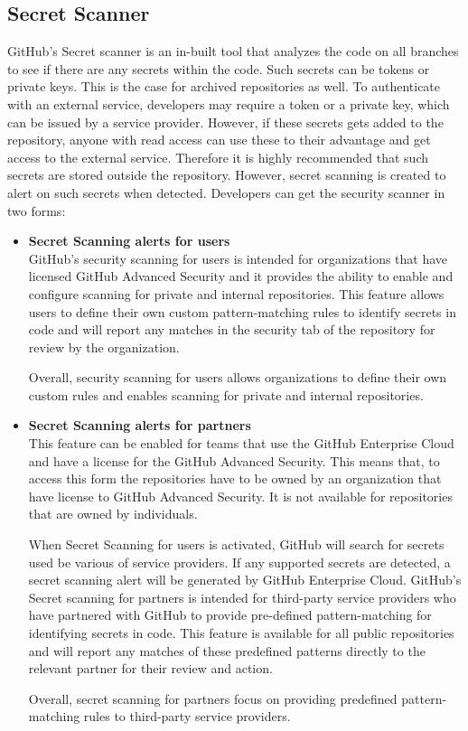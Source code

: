 \subsection{Secret Scanner}
GitHub's Secret scanner is an in-built tool that analyzes the code on all branches to see if there are any secrets within the code. Such secrets can be tokens or private keys. This is the case for archived repositories as well. To authenticate with an external service, developers may require a token or a private key, which can be issued by a service provider. However, if these secrets gets added to the repository, anyone with read access can use these to their advantage and get access to the external service. Therefore it is highly recommended that such secrets are stored outside the repository. However, secret scanning is created to alert on such secrets when detected. Developers can get the
security scanner in two forms\cite{GithubSecretScanning}: 
\begin{itemize}
    \item \textbf{Secret Scanning alerts for users}\\
GitHub's security scanning for users is intended for organizations that have licensed GitHub Advanced Security and it provides the ability to enable and configure scanning for private and internal repositories. This feature allows users to define their own custom pattern-matching rules to identify secrets in code and will report any matches in the security tab of the repository for review by the organization. 

Overall, security scanning for users allows organizations to define their own custom rules and enables scanning for private and internal repositories.

\item \textbf{Secret Scanning alerts for partners}\\
This feature can be enabled for teams that use the GitHub Enterprise Cloud and have a license for the GitHub Advanced Security. This means that, to access this form the repositories have to be owned by an organization that have license to GitHub Advanced Security. It is not available for repositories that are owned by individuals. 

When Secret Scanning for users is activated, GitHub will search for secrets used be various of service providers. If any supported secrets are detected, a secret scanning alert will be generated by GitHub Enterprise Cloud.
GitHub's Secret scanning for partners is intended for  third-party service providers who have partnered with GitHub to provide pre-defined pattern-matching for identifying secrets in code. This feature is available for all public repositories and will report any matches of these predefined patterns directly to the relevant partner for their review and action. 

Overall, secret scanning for partners focus on providing predefined pattern-matching rules to third-party service providers. 
\end{itemize}
